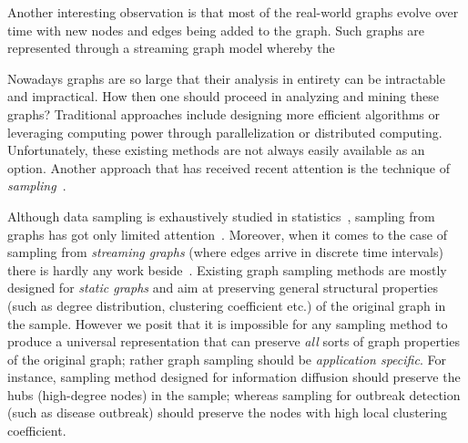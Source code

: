 Another interesting observation is that most of the real-world graphs evolve over time with new nodes and edges being added to the graph. Such graphs are represented through a streaming graph model whereby the 
\fi


Nowadays graphs are so large that their analysis in entirety can be intractable and impractical. How then one should proceed in analyzing and mining these graphs? Traditional approaches include designing more efficient algorithms or leveraging computing power through parallelization or distributed computing. Unfortunately, these existing methods are not always easily available as an option. Another approach that has received recent attention is the technique of {\em sampling}~\cite{leskovec2006sampling}.

Although data sampling is exhaustively studied in statistics~\cite{doucet2000sequential,hastings1970monte}, sampling from graphs has got only limited attention~\cite{gjoka2010walking,maiya2010sampling,rasti2009respondent,ribeiro2010estimating}. Moreover, when it comes to the case of sampling from {\em streaming graphs} (where edges arrive in discrete time intervals) there is hardly any work beside~\cite{aggarwal2011outlier,ahmed2014network}. 
Existing graph sampling methods are mostly designed for {\em static graphs} and aim at preserving general structural properties (such as degree distribution, clustering coefficient etc.) of the original graph in the sample. However we posit that it is impossible for any sampling method to produce a universal representation that can preserve {\em all} sorts of graph properties of the original graph; rather graph sampling should be {\em application specific}. For instance, sampling method designed for information diffusion should preserve the hubs (high-degree nodes) in the sample; whereas sampling for outbreak detection (such as disease outbreak) should preserve the nodes with high local clustering coefficient.

